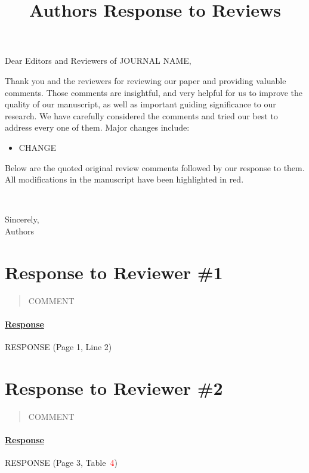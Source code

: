 \documentclass[10pt]{article}
\title{\textbf{Authors Response to Reviews}}
\author{}
\date{\begin{flushright}\today\end{flushright}}
\providecommand{\fref}[1]{\textcolor{red}{#1}} %
\providecommand{\ftabref}[1]{Table~\fref{#1}}
\newenvironment{bgquote}
{
  \begin{tcolorbox}[
    colback=gray!10,        %
    colframe=gray!10,       %
    boxrule=0pt,            %
    arc=0pt,                %
    left=0pt,               %
    right=0pt,              %
    top=4pt,                %
    bottom=8pt              %
  ]
  \begin{quote}
  \itshape %
}
{\end{quote}\end{tcolorbox}}
\begin{document}
\maketitle

\noindent Dear Editors and Reviewers of JOURNAL NAME,\newline

Thank you and the reviewers for reviewing our paper and providing valuable comments.
Those comments are insightful,
and very helpful for us to improve the quality of our manuscript,
as well as important guiding significance to our research.
We have carefully considered the comments and tried our best to address every one of them.
Major changes include:
\begin{itemize}
  \item CHANGE
\end{itemize}

Below are the quoted original review comments followed by our response to them.
All modifications in the manuscript have been highlighted in red.

~\newline

Sincerely, \\
Authors

\newpage
\section*{Response to Reviewer \#1}

\begin{bgquote}
COMMENT
\end{bgquote}

\paragraph{\underline{Response}}
RESPONSE (Page 1, Line 2)


\newpage
\section*{Response to Reviewer \#2}

\begin{bgquote}
COMMENT
\end{bgquote}

\paragraph{\underline{Response}}
RESPONSE (Page 3, \ftabref{4})
\end{document}
